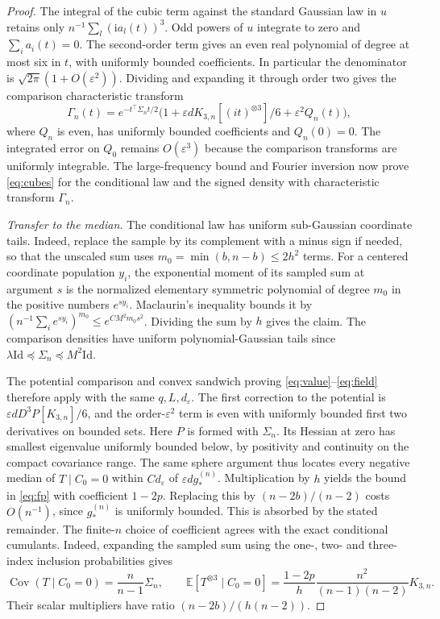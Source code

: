 \documentclass[10pt,letterpaper]{article}
\newcommand{\E}{\mathbb E}
\newcommand{\id}{\mathrm{Id}}
\newcommand{\eps}{\varepsilon}
\newcommand{\gstar}{g_{\!*}}
\begin{document}
\begin{proof}
The integral of the cubic term against the standard Gaussian law in $u$ retains only $n^{-1}\sum_l(\mathrm{i}a_l(t))^3$. Odd powers of $u$ integrate to zero and $\sum_i a_i(t)=0$. The second-order term gives an even real polynomial of degree at most six in $t$, with uniformly bounded coefficients. In particular the denominator is $\sqrt{2\pi}(1+O(\eps^2))$. Dividing and expanding it through order two gives the comparison characteristic transform
\[
 \Gamma_n(t)=e^{-t^\top\Sigma_n t/2}
 \bigl(1+\eps d K_{3,n}[(it)^{\otimes3}]/6+\eps^2 Q_n(t)\bigr),
\]
where $Q_n$ is even, has uniformly bounded coefficients and $Q_n(0)=0$. The integrated error on $Q_0$ remains $O(\eps^3)$ because the comparison transforms are uniformly integrable. The large-frequency bound and Fourier inversion now prove \eqref{eq:cubes} for the conditional law and the signed density with characteristic transform $\Gamma_n$.

\emph{Transfer to the median.}
The conditional law has uniform sub-Gaussian coordinate tails. Indeed, replace the sample by its complement with a minus sign if needed, so that the unscaled sum uses $m_0=\min(b,n-b)\le2h^2$ terms. For a centered coordinate population $y_i$, the exponential moment of its sampled sum at argument $s$ is the normalized elementary symmetric polynomial of degree $m_0$ in the positive numbers $e^{sy_i}$. Maclaurin's inequality bounds it by $(n^{-1}\sum_i e^{sy_i})^{m_0}\le e^{C M^2 m_0s^2}$. Dividing the sum by $h$ gives the claim. The comparison densities have uniform polynomial-Gaussian tails since $\lambda\id\preceq\Sigma_n\preceq M^2\id$.

The potential comparison and convex sandwich proving \eqref{eq:value}--\eqref{eq:field} therefore apply with the same $q,L,d_\eps$. The first correction to the potential is $\eps d D^3P[K_{3,n}]/6$, and the order-$\eps^2$ term is even with uniformly bounded first two derivatives on bounded sets. Here $P$ is formed with $\Sigma_n$. Its Hessian at zero has smallest eigenvalue uniformly bounded below, by positivity and continuity on the compact covariance range. The same sphere argument thus locates every negative median of $T\mid C_0=0$ within $C d_\eps$ of $\eps d\gstar^{(n)}$. Multiplication by $h$ yields the bound in \eqref{eq:fp} with coefficient $1-2p$. Replacing this by $(n-2b)/(n-2)$ costs $O(n^{-1})$, since $\gstar^{(n)}$ is uniformly bounded. This is absorbed by the stated remainder. The finite-$n$ choice of coefficient agrees with the exact conditional cumulants. Indeed, expanding the sampled sum using the one-, two- and three-index inclusion probabilities gives
\[
 \operatorname{Cov}(T\mid C_0=0)=\frac{n}{n-1}\Sigma_n,\qquad
 \E[T^{\otimes3}\mid C_0=0]
   =\frac{1-2p}{h}\frac{n^2}{(n-1)(n-2)}K_{3,n}.
\]
Their scalar multipliers have ratio $(n-2b)/(h(n-2))$.
\end{proof}
\end{document}
